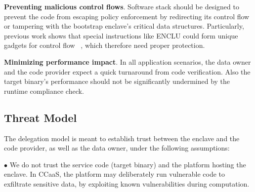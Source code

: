 \vspace{3pt}\noindent\textbf{Preventing malicious control flows}.\label{challenge-cfi} 
Software stack should be designed to prevent the code from escaping policy enforcement by redirecting its control flow or tampering with the bootstrap enclave's critical data structures. Particularly, previous work shows that special instructions like ENCLU could form unique gadgets for control flow \DIFdelbegin {}\DIFdelend \DIFaddbegin {}\DIFaddend ~\cite{biondo2018guard}, which therefore need proper protection. 

\vspace{3pt}\noindent\textbf{Minimizing performance impact}.\label{challenge-perf} In all application scenarios, the data owner and the code provider expect a quick turnaround from code verification. Also the target binary's performance should not be significantly undermined by the runtime compliance check. 




\subsection{Threat Model}
\label{subsec-threat}

The delegation model is meant to establish trust between the enclave and the code provider, as well as the data owner, under the following assumptions: 


\vspace{2pt}\noindent$\bullet$ We do not trust the service code (target binary) and the platform hosting the enclave. In CCaaS, the platform may deliberately run vulnerable code to exfiltrate sensitive data, by exploiting \DIFdelbegin {}\DIFdelend known vulnerabilities during \DIFaddbegin {}\DIFaddend computation. 

